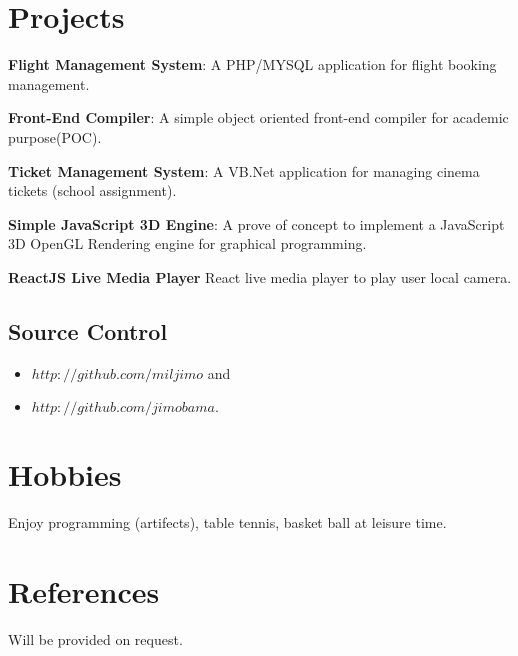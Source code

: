 \documentclass[11px]{article}
\begin{document}
\section*{Projects}
\textbf{Flight Management System}: A PHP/MYSQL application for flight booking management.

\textbf{Front-End Compiler}: A simple object oriented front-end compiler for academic purpose(POC).

\textbf{Ticket Management System}: A VB.Net application for managing cinema tickets (school assignment).

\textbf{Simple JavaScript 3D Engine}: A prove of concept to implement a JavaScript 3D OpenGL Rendering engine for graphical programming.

\textbf{ReactJS Live Media Player} React  live media player to play user local camera.



\subsection{Source Control}
\begin{itemize}
	\item $http://github.com/miljimo$ and
	\item  $  http://github.com/jimobama .$
\end{itemize} 
\hrulefill
\section{Hobbies}
Enjoy programming (artifects), table tennis, basket ball at leisure time.
\section*{References}
Will be provided on request.
\end{document}
